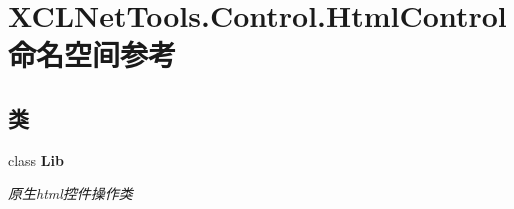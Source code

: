 \hypertarget{namespace_x_c_l_net_tools_1_1_control_1_1_html_control}{}\section{X\+C\+L\+Net\+Tools.\+Control.\+Html\+Control 命名空间参考}
\label{namespace_x_c_l_net_tools_1_1_control_1_1_html_control}
\subsection*{类}
\begin{DoxyCompactItemize}
\item 
class {\bfseries Lib}
\begin{DoxyCompactList}\small\item\em 原生html控件操作类 \end{DoxyCompactList}\end{DoxyCompactItemize}
